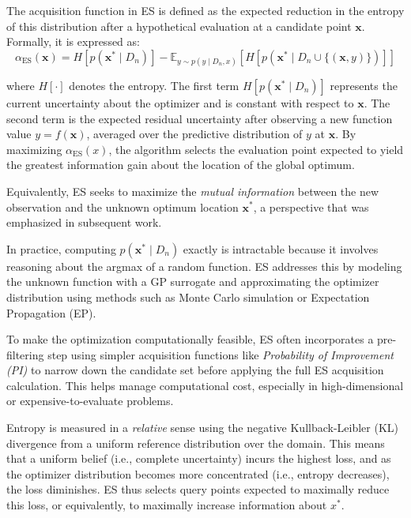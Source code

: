 \documentclass{ut-thesis}
\begin{document}
The acquisition function in ES is defined as the expected reduction in the entropy of this distribution after a hypothetical evaluation at a candidate point \( \mathbf{x} \). Formally, it is expressed as:
\begin{equation}
    \alpha_{\text{ES}}(\mathbf{x}) = H[p(\mathbf{x}^* \mid D_n)] - \mathbb{E}_{y \sim p(y \mid D_n, x)} \left[ H[p(\mathbf{x}^* \mid D_n \cup \{(\mathbf{x}, y)\})] \right]
\end{equation}

where \( H[\cdot] \) denotes the entropy. The first term \( H[p(\mathbf{x}^* \mid D_n)] \) represents the current uncertainty about the optimizer and is constant with respect to \( \mathbf{x} \). The second term is the expected residual uncertainty after observing a new function value \( y = f(\mathbf{x}) \), averaged over the predictive distribution of \( y \) at \( \mathbf{x} \). By maximizing \( \alpha_{\text{ES}}(x) \), the algorithm selects the evaluation point expected to yield the greatest information gain about the location of the global optimum.

Equivalently, ES seeks to maximize the \emph{mutual information} between the new observation and the unknown optimum location \( \mathbf{x}^* \), a perspective that was emphasized in subsequent work.

In practice, computing \( p(\mathbf{x}^* \mid D_n) \) exactly is intractable because it involves reasoning about the argmax of a random function. ES addresses this by modeling the unknown function with a GP surrogate and approximating the optimizer distribution using methods such as Monte Carlo simulation or Expectation Propagation (EP).

To make the optimization computationally feasible, ES often incorporates a pre-filtering step using simpler acquisition functions like \emph{Probability of Improvement (PI)} to narrow down the candidate set before applying the full ES acquisition calculation. This helps manage computational cost, especially in high-dimensional or expensive-to-evaluate problems.

Entropy is measured in a \emph{relative} sense using the negative Kullback-Leibler (KL) divergence from a uniform reference distribution over the domain. This means that a uniform belief (i.e., complete uncertainty) incurs the highest loss, and as the optimizer distribution becomes more concentrated (i.e., entropy decreases), the loss diminishes. ES thus selects query points expected to maximally reduce this loss, or equivalently, to maximally increase information about \( x^* \).
\end{document}
